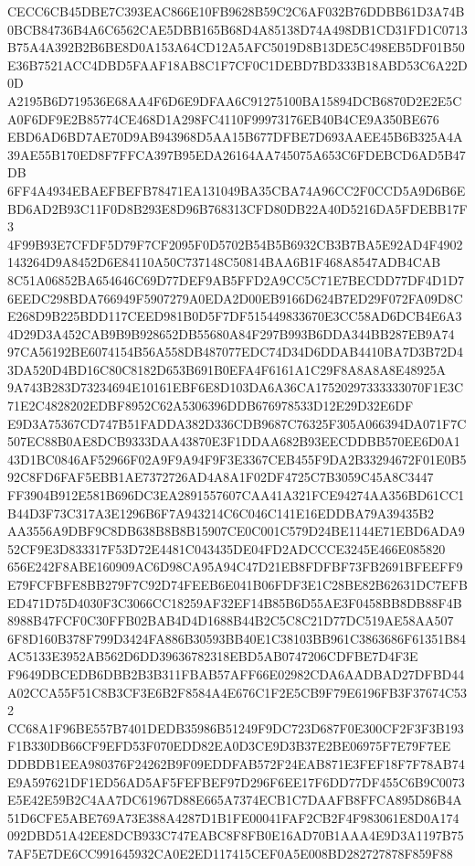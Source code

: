 \documentclass[UTF8,fontset=fandol,zihao=-4,a4paper]{ctexart}
\begin{document}
{{CECC6CB45DBE7C393EAC866E10FB9628B59C2C6AF032B76DDBB61D3A74B0BCB84736B4A6C6562CAE5DBB165B68D4A85138D74A498DB1CD31FD1C0713
B75A4A392B2B6BE8D0A153A64CD12A5AFC5019D8B13DE5C498EB5DF01B50E36B7521ACC4DBD5FAAF18AB8C1F7CF0C1DEBD7BD333B18ABD53C6A22D0D
A2195B6D719536E68AA4F6D6E9DFAA6C91275100BA15894DCB6870D2E2E5CA0F6DF9E2B85774CE468D1A298FC4110F99973176EB40B4CE9A350BE676
EBD6AD6BD7AE70D9AB943968D5AA15B677DFBE7D693AAEE45B6B325A4A39AE55B170ED8F7FFCA397B95EDA26164AA745075A653C6FDEBCD6AD5B47DB
6FF4A4934EBAEFBEFB78471EA131049BA35CBA74A96CC2F0CCD5A9D6B6EBD6AD2B93C11F0D8B293E8D96B768313CFD80DB22A40D5216DA5FDEBB17F3
4F99B93E7CFDF5D79F7CF2095F0D5702B54B5B6932CB3B7BA5E92AD4F4902143264D9A8452D6E84110A50C737148C50814BAA6B1F468A8547ADB4CAB
8C51A06852BA654646C69D77DEF9AB5FFD2A9CC5C71E7BECDD77DF4D1D76EEDC298BDA766949F5907279A0EDA2D00EB9166D624B7ED29F072FA09D8C
E268D9B225BDD117CEED981B0D5F7DF515449833670E3CC58AD6DCB4E6A34D29D3A452CAB9B9B928652DB55680A84F297B993B6DDA344BB287EB9A74
97CA56192BE6074154B56A558DB487077EDC74D34D6DDAB4410BA7D3B72D43DA520D4BD16C80C8182D653B691B0EFA4F6161A1C29F8A8A8A8E48925A
9A743B283D73234694E10161EBF6E8D103DA6A36CA17520297333333070F1E3C71E2C4828202EDBF8952C62A5306396DDB676978533D12E29D32E6DF
E9D3A75367CD747B51FADDA382D336CDB9687C76325F305A066394DA071F7C507EC88B0AE8DCB9333DAA43870E3F1DDAA682B93EECDDBB570EE6D0A1
43D1BC0846AF52966F02A9F9A94F9F3E3367CEB455F9DA2B33294672F01E0B592C8FD6FAF5EBB1AE7372726AD4A8A1F02DF4725C7B3059C45A8C3447
FF3904B912E581B696DC3EA2891557607CAA41A321FCE94274AA356BD61CC1B44D3F73C317A3E1296B6F7A943214C6C046C141E16EDDBA79A39435B2
AA3556A9DBF9C8DB638B8B8B15907CE0C001C579D24BE1144E71EBD6ADA952CF9E3D833317F53D72E4481C043435DE04FD2ADCCCE3245E466E085820
656E242F8ABE160909AC6D98CA95A94C47D21EB8FDFBF73FB2691BFEEFF9E79FCFBFE8BB279F7C92D74FEEB6E041B06FDF3E1C28BE82B62631DC7EFB
ED471D75D4030F3C3066CC18259AF32EF14B85B6D55AE3F0458BB8DB88F4B8988B47FCF0C30FFB02BAB4D4D1688B44B2C5C8C21D77DC519AE58AA507
6F8D160B378F799D3424FA886B30593BB40E1C38103BB961C3863686F61351B84AC5133E3952AB562D6DD39636782318EBD5AB0747206CDFBE7D4F3E
F9649DBCEDB6DBB2B3B311FBAB57AFF66E02982CDA6AADBAD27DFBD44A02CCA55F51C8B3CF3E6B2F8584A4E676C1F2E5CB9F79E6196FB3F37674C532
CC68A1F96BE557B7401DEDB35986B51249F9DC723D687F0E300CF2F3F3B193F1B330DB66CF9EFD53F070EDD82EA0D3CE9D3B37E2BE06975F7E79F7EE
DDBDB1EEA980376F24262B9F09EDDFAB572F24EAB871E3FEF18F7F78AB74E9A597621DF1ED56AD5AF5FEFBEF97D296F6EE17F6DD77DF455C6B9C0073
E5E42E59B2C4AA7DC61967D88E665A7374ECB1C7DAAFB8FFCA895D86B4A51D6CFE5ABE769A73E388A4287D1B1FE00041FAF2CB2F4F983061E8D0A174
092DBD51A42EE8DCB933C747EABC8F8FB0E16AD70B1AAA4E9D3A1197B757AF5E7DE6CC991645932CA0E2ED117415CEF0A5E008BD282727878F859F88
}}
\end{document}
